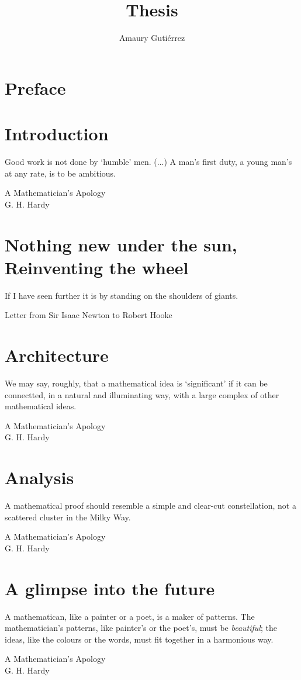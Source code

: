 \documentclass[12pt,letterpaper]{book}
\author{Amaury Guti\'errez}
\title{Thesis}
\theoremstyle{definition} \newtheorem{definition}{Definición}[section]
\theoremstyle{plain} \newtheorem{theorem}{Teorema}[section]
\theoremstyle{plain} \newtheorem{lemma}{Lema}[section]
\theoremstyle{plain} \newtheorem{proposition}[theorem]{Proposici\'on}
\theoremstyle{plain} \newtheorem{corollary}[theorem]{Corolario}
\theoremstyle{plain} \newtheorem{remark}[theorem]{Comentario}
\begin{document}
\frontmatter
 



\frontmatter
\tableofcontents
\chapter{Preface}


\mainmatter

\chapter{Introduction}
\epigraph{Good work is not done by `humble' men. (...) A man's first duty, a young man's at any rate, is to be ambitious.}{A Mathematician's Apology \\ G. H. Hardy}


\chapter{Nothing new under the sun, Reinventing the wheel}
\epigraph{If I have seen further it is by standing on the shoulders of giants.}{Letter from Sir Isaac Newton to Robert Hooke}


\chapter{Architecture}
\epigraph{We may say, roughly, that a mathematical idea is `significant' if it can be connectted, in a natural and illuminating way, with a large complex of other mathematical ideas.}{A Mathematician's Apology \\ G. H. Hardy}


\chapter{Analysis}
\epigraph{A mathematical proof should resemble a simple and clear-cut constellation, not a scattered cluster in the Milky Way.}{A Mathematician's Apology \\ G. H. Hardy}


\chapter{A glimpse into the future}
\epigraph{A mathematican, like a painter or a poet, is a maker of patterns. The mathematician's patterns, like painter's or the poet's, must be \emph{beautiful}; the ideas, like the colours or the words, must fit together in a harmonious way.}{A Mathematician's Apology \\ G. H. Hardy}

\end{document}

